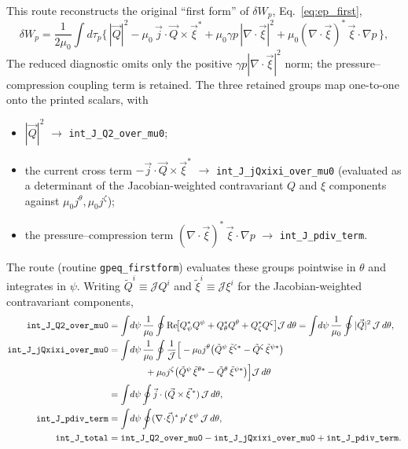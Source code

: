 \documentclass[10pt,a4paper]{article}
\numberwithin{equation}{section}
\begin{document}
This route reconstructs the original ``first form'' of $\delta W_p$, Eq.~\eqref{eq:ep_first},
\begin{equation}
\delta W_p=\frac{1}{2\mu_0}\int d\tau_p
\Big\{\,|\vec Q|^2
-\mu_0\,\vec j\cdot\vec Q\times\vec\xi^{*}
+\mu_0\gamma p\,|\nabla\!\cdot\!\vec\xi|^2
+\mu_0(\nabla\!\cdot\!\vec\xi)^{*}\,\vec\xi\cdot\nabla p\,\Big\},
\label{eq:dWp_recon2}
\end{equation}
The reduced diagnostic omits only the positive
\(\gamma p|\nabla\!\cdot\!\vec\xi|^2\) norm; the pressure--compression coupling
term is retained.  The three retained groups map one-to-one onto the printed
scalars, with
\begin{itemize}
\item $|\vec Q|^2$ $\to$ \texttt{int\_J\_Q2\_over\_mu0};
\item the current cross term $-\vec j\cdot\vec Q\times\vec\xi^{*}$ $\to$
  \texttt{int\_J\_jQxixi\_over\_mu0} (evaluated as a determinant of the
  Jacobian-weighted contravariant $Q$ and $\xi$ components against
  $\mu_0 j^\theta,\mu_0 j^\zeta$);
\item the pressure--compression term
  $(\nabla\!\cdot\!\vec\xi)^{*}\,\vec\xi\cdot\nabla p$ $\to$
  \texttt{int\_J\_pdiv\_term}.
\end{itemize}
The route (routine \texttt{gpeq\_firstform}) evaluates these groups pointwise
in $\theta$ and integrates in $\psi$.  Writing
$\tilde Q^i\equiv\mathcal JQ^i$ and $\tilde\xi^i\equiv\mathcal J\xi^i$ for the
Jacobian-weighted contravariant components,
\begin{align}
\texttt{int\_J\_Q2\_over\_mu0}
&=\int\! d\psi\,\frac{1}{\mu_0}\oint
  \mathrm{Re}\!\big[Q_\psi^*Q^\psi+Q_\theta^*Q^\theta+Q_\zeta^*Q^\zeta\big]
  \mathcal J\,d\theta
 =\int\! d\psi\,\frac{1}{\mu_0}\oint|\vec Q|^2\,\mathcal J\,d\theta,\\
\texttt{int\_J\_jQxixi\_over\_mu0}
&=\int\! d\psi\,\frac{1}{\mu_0}\oint\frac{1}{\mathcal J}
  \Big[-\mu_0 j^\theta\bigl(\tilde Q^\psi\,\tilde\xi^{\zeta*}-\tilde Q^\zeta\,\tilde\xi^{\psi*}\bigr)
  \notag\\
&\qquad\qquad
       +\mu_0 j^\zeta\bigl(\tilde Q^\psi\,\tilde\xi^{\theta*}-\tilde Q^\theta\,\tilde\xi^{\psi*}\bigr)
  \Big]\mathcal J\,d\theta
  \notag\\
&=\int\! d\psi\oint \vec j\cdot(\vec Q\times\vec\xi^{\,*})\,\mathcal J\,d\theta,\\
\texttt{int\_J\_pdiv\_term}
&=\int\! d\psi\oint
  (\nabla\!\cdot\!\vec\xi)^{*}\,p'\,\xi^{\psi}\,
  \mathcal J\,d\theta,\\
\texttt{int\_J\_total}
&=\texttt{int\_J\_Q2\_over\_mu0}
 -\texttt{int\_J\_jQxixi\_over\_mu0}
 +\texttt{int\_J\_pdiv\_term}.
\end{align}
\end{document}
